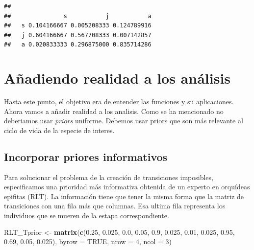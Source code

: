 \documentclass[
]{book}
\newenvironment{Shaded}{\begin{snugshade}}{\end{snugshade}}
\newcommand{\AttributeTok}[1]{\textcolor[rgb]{0.13,0.29,0.53}{#1}}
\newcommand{\ConstantTok}[1]{\textcolor[rgb]{0.56,0.35,0.01}{#1}}
\newcommand{\DecValTok}[1]{\textcolor[rgb]{0.00,0.00,0.81}{#1}}
\newcommand{\FloatTok}[1]{\textcolor[rgb]{0.00,0.00,0.81}{#1}}
\newcommand{\FunctionTok}[1]{\textcolor[rgb]{0.13,0.29,0.53}{\textbf{#1}}}
\newcommand{\NormalTok}[1]{#1}
\newcommand{\OtherTok}[1]{\textcolor[rgb]{0.56,0.35,0.01}{#1}}
\theoremstyle{definition}
\theoremstyle{definition}
\theoremstyle{definition}
\theoremstyle{definition}
\theoremstyle{remark}
\begin{document}
\begin{verbatim}
##    
##               s           j           a
##   s 0.104166667 0.005208333 0.124789916
##   j 0.604166667 0.567708333 0.007142857
##   a 0.020833333 0.296875000 0.835714286
\end{verbatim}

\section{Añadiendo realidad a los análisis}\label{auxf1adiendo-realidad-a-los-anuxe1lisis}

Hasta este punto, el objetivo era de entender las funciones y su
aplicaciones. Ahora vamos a añadir realidad a los analisis. Como se ha
mencionado no deberiamos usar \emph{priors} uniforme. Debemos usar priors que
son más relevante al ciclo de vida de la especie de interes.

\subsection{Incorporar priores informativos}\label{incorporar-priores-informativos}

Para solucionar el problema de la creación de transiciones imposibles,
especificamos una prioridad más informativa obtenida de un experto en
orquídeas epifitas (RLT). La información tiene que tener la misma forma
que la matriz de transiciones con una fila más que columnas. Esa ultima
fila representa los individuos que se mueren de la estapa
correspondiente.

\begin{Shaded}
\begin{Highlighting}[]
\NormalTok{RLT\_Tprior }\OtherTok{\textless{}{-}} \FunctionTok{matrix}\NormalTok{(}\FunctionTok{c}\NormalTok{(}\FloatTok{0.25}\NormalTok{, }\FloatTok{0.025}\NormalTok{, }\FloatTok{0.0}\NormalTok{,}
                       \FloatTok{0.05}\NormalTok{, }\FloatTok{0.9}\NormalTok{,   }\FloatTok{0.025}\NormalTok{,}
                       \FloatTok{0.01}\NormalTok{, }\FloatTok{0.025}\NormalTok{, }\FloatTok{0.95}\NormalTok{,}
                       \FloatTok{0.69}\NormalTok{, }\FloatTok{0.05}\NormalTok{,  }\FloatTok{0.025}\NormalTok{), }
                     \AttributeTok{byrow =} \ConstantTok{TRUE}\NormalTok{, }\AttributeTok{nrow =} \DecValTok{4}\NormalTok{, }\AttributeTok{ncol =} \DecValTok{3}\NormalTok{)}
\end{Highlighting}
\end{Shaded}
\end{document}
